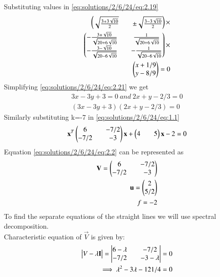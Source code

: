 Substituting values in \eqref{eq:solutions/2/6/24/eq:2.19}
\begin{equation} \label{eq:solutions/2/6/24/eq:2.21}
\begin{split}
\begin{pmatrix} \sqrt{\frac{3+3\sqrt{10}}{2}} && \pm\sqrt{\frac{3-3\sqrt{10}}{2}}\end{pmatrix} \times \\
\begin{pmatrix} -\frac{3+\sqrt{10}}{\sqrt{20+6\sqrt{10}}} && \frac{1}{\sqrt{20+6\sqrt{10}}} \\ -\frac{3-\sqrt{10}}{\sqrt{20-6\sqrt{10}}} && -\frac{1}{\sqrt{20-6\sqrt{10}}}\end{pmatrix} \times \\
\begin{pmatrix}x+1/9 \\ y-8/9\end{pmatrix}  = 0
\end{split}
\end{equation}
Simplifying \eqref{eq:solutions/2/6/24/eq:2.21} we get 
\begin{equation}\label{eq:solutions/2/6/24/eq:2.22}
\begin{split}
3x - 3y + 3 = 0 ~and~ 2x + y - 2/3 = 0\\
\boxed{(3x - 3y + 3)(2x + y - 2/3) = 0}
\end{split}
\end{equation}
Similarly substituting k=-7 in \eqref{eq:solutions/2/6/24/eq:1.1}
\begin{equation}\label{eq:solutions/2/6/24/eq:2.23}
\mathbf{x}^T \begin{pmatrix}6 && -7/2 \\ -7/2 && -3\end{pmatrix} \mathbf{x} + \begin{pmatrix}4 && 5\end{pmatrix}\mathbf{x} -2 = 0
\end{equation}
Equation \eqref{eq:solutions/2/6/24/eq:2.2} can be represented as 
\begin{equation} \label{eq:solutions/2/6/24/2.24}
\begin{split}
\mathbf{V}=\begin{pmatrix}6 && -7/2\\ -7/2 && -3\end{pmatrix}\\
\mathbf{u}=\begin{pmatrix}2\\5/2\end{pmatrix}\\
f= -2
\end{split}
\end{equation}
To find the separate equations of the straight lines we will use spectral decomposition.\\
Characteristic equation of $\vec{V}$ is given by:
\begin{equation} \label{eq:solutions/2/6/24/2.25}
\begin{split}
\begin{vmatrix}V-\lambda \mathbf{I}\end{vmatrix}=\begin{vmatrix}6-\lambda && -7/2\\ -7/2 && -3-\lambda\end{vmatrix} = 0\\
\implies \lambda^2 - 3\lambda - 121/4 = 0
\end{split}
\end{equation}
